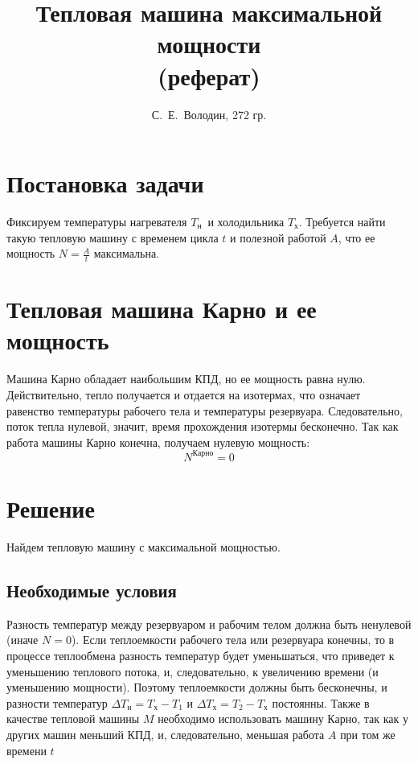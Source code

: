 \documentclass[a4paper]{article}
\title{Тепловая машина максимальной мощности\\(реферат)}
\author{С.~Е.~Володин, 272 гр.}
\date{}
\newcommand{\Tx}{$T_\text{х}$}
\newcommand{\Tn}{$T_\text{н}$}
\begin{document}
\maketitle
\section{Постановка задачи}
Фиксируем температуры нагревателя \Tn\ и холодильника \Tx. Требуется найти такую тепловую машину с временем цикла $t$ и полезной работой $A$, что ее мощность
$
N=\frac{A}{t}
$
максимальна.
\section{Тепловая машина Карно и ее мощность}
Машина Карно обладает наибольшим КПД, но ее мощность равна нулю. Действительно, тепло получается и отдается на изотермах, что означает равенство температуры рабочего тела и температуры резервуара. Следовательно, поток тепла нулевой, значит, время прохождения изотермы бесконечно. Так как работа машины Карно конечна, получаем нулевую мощность:
$$N^{\text{Карно}}=0$$
\section{Решение}
Найдем тепловую машину с максимальной мощностью.
\subsection{Необходимые условия}
Разность температур между резервуаром и рабочим телом должна быть ненулевой (иначе $N=0$).\newline
Если теплоемкости рабочего тела или резервуара конечны, то в процессе теплообмена разность температур будет уменьшаться, что приведет к уменьшению теплового потока, и, следовательно, к увеличению времени (и уменьшению мощности). Поэтому теплоемкости должны быть бесконечны, и разности температур $\Delta T_\text{н}=T_\text{х}-T_1$ и $\Delta T_\text{х}=T_2-T_\text{х}$ постоянны.\newline
Также в качестве тепловой машины $M$ необходимо использовать машину Карно, так как у других машин меньший КПД, и, следовательно, меньшая работа $A$ при том же времени $t$
\end{document}
